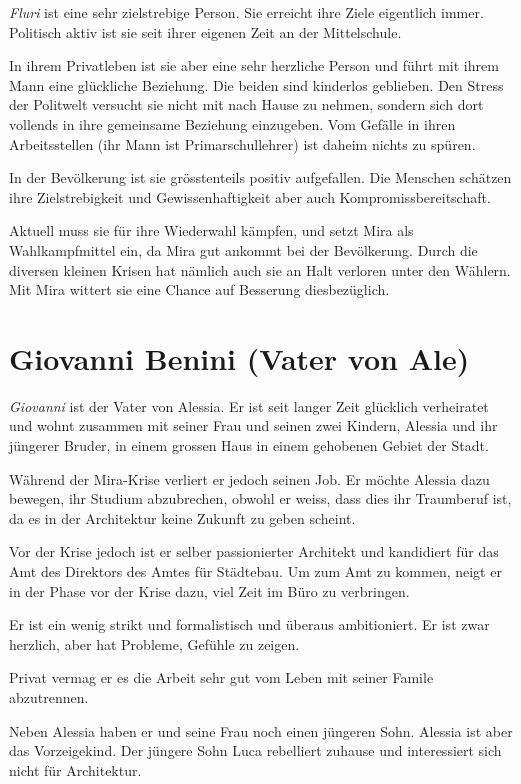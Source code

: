 \documentclass[11pt,a4paper,ngerman]{scrreprt}
\begin{document}
\emph{Fluri} ist eine sehr zielstrebige Person. Sie erreicht ihre Ziele eigentlich
immer. Politisch aktiv ist sie seit ihrer eigenen Zeit an der Mittelschule.

In ihrem Privatleben ist sie aber eine sehr herzliche Person und führt mit ihrem
Mann eine glückliche Beziehung. Die beiden sind kinderlos geblieben. Den Stress
der Politwelt versucht sie nicht mit nach Hause zu nehmen, sondern sich dort
vollends in ihre gemeinsame Beziehung einzugeben. Vom Gefälle in ihren
Arbeitsstellen (ihr Mann ist Primarschullehrer) ist daheim nichts zu spüren.

In der Bevölkerung ist sie grösstenteils positiv aufgefallen. Die Menschen
schätzen ihre Zielstrebigkeit und Gewissenhaftigkeit aber auch
Kompromissbereitschaft.

Aktuell muss sie für ihre Wiederwahl kämpfen, und setzt Mira als Wahlkampfmittel
ein, da Mira gut ankommt bei der Bevölkerung. Durch die diversen kleinen Krisen
hat nämlich auch sie an Halt verloren unter den Wählern. Mit Mira wittert sie
eine Chance auf Besserung diesbezüglich.


\section*{Giovanni Benini (Vater von Ale)}

\emph{Giovanni} ist der Vater von Alessia. Er ist seit langer Zeit glücklich
verheiratet und wohnt zusammen mit seiner Frau und seinen zwei Kindern, Alessia
und ihr jüngerer Bruder, in einem grossen Haus in einem gehobenen Gebiet der
Stadt.

Während der Mira-Krise verliert er jedoch seinen Job. Er möchte Alessia dazu
bewegen, ihr Studium abzubrechen, obwohl er weiss, dass dies ihr Traumberuf ist,
da es in der Architektur keine Zukunft zu geben scheint.

Vor der Krise jedoch ist er selber passionierter Architekt und kandidiert für
das Amt des Direktors des Amtes für Städtebau. Um zum Amt zu kommen, neigt er in
der Phase vor der Krise dazu, viel Zeit im Büro zu verbringen.

Er ist ein wenig strikt und formalistisch und überaus ambitioniert.  Er ist zwar
herzlich, aber hat Probleme, Gefühle zu zeigen.

Privat vermag er es die Arbeit sehr gut vom Leben mit seiner Famile abzutrennen.

Neben Alessia haben er und seine Frau noch einen jüngeren Sohn. Alessia ist aber
das Vorzeigekind. Der jüngere Sohn Luca rebelliert zuhause und interessiert sich
nicht für Architektur.
\end{document}
